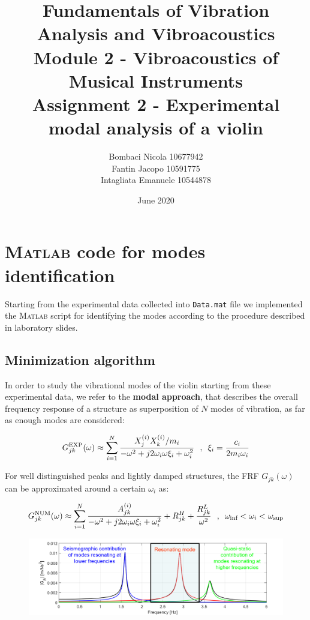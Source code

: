 \documentclass[a4paper,12pt,oneside]{article}
\title{Fundamentals of Vibration Analysis and Vibroacoustics \\
	Module 2 - Vibroacoustics of Musical Instruments \\
	Assignment 2 - Experimental modal analysis of a violin}
\author{Bombaci Nicola 10677942 \\
	Fantin Jacopo 10591775 \\
	Intagliata Emanuele 10544878}
\date{June 2020}
\begin{document}
\maketitle

\vspace{100pt}


\section{\textsc{Matlab} code for modes identification}

Starting from the experimental data collected into \lstinline!Data.mat! file we implemented the \textsc{Matlab} script for identifying the modes according to the
procedure described in laboratory slides.

\subsection{Minimization algorithm}

In order to study the vibrational modes of the violin starting from these experimental data, we refer to the \textbf{modal approach}, that describes the overall frequency response of a structure as superposition of $ N $ modes of vibration, as far as enough modes are considered:

\begin{equation}
\label{eqn:h_exp_modal} 
	G^\textup{EXP}_{jk}(\omega) \approx \sum_{i=1}^{N} \frac{X_j^{(i)} X_k^{(i)} / m_i}
		{-\omega^2 + j 2 \omega_i \omega \xi_i + \omega^2_i}
		\text{~ , ~}
		\xi_i = \frac{c_i}{2 m_i \omega_i}
\end{equation}

For well distinguished peaks and lightly damped structures, the FRF $ G_{jk} (\omega) $ can be approximated around a certain $ \omega_i $ as:

\begin{equation}
\label{eqn:h_approx} 
	G^\textup{NUM}_{jk}(\omega) \approx \sum_{i=1}^{N} \frac{ A_{jk}^{(i)} }
		{-\omega^2 + j 2 \omega_i \omega \xi_i + \omega^2_i}
		+ R^H_{jk} + \frac{R^L_{jk}}{\omega^2}
		\text{~ , ~}
		\omega_\textup{inf} < \omega_i < \omega_\textup{sup}
\end{equation}

\begin{figure}[H]
	\centering
	\includegraphics[scale=0.5]{Gapprox_slides}
\end{figure}
\end{document}
